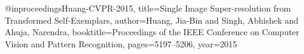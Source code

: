 @inproceedings{Huang-CVPR-2015,
  title={Single Image Super-resolution from Transformed Self-Exemplars},
  author={Huang, Jia-Bin and Singh, Abhishek and Ahuja, Narendra},
  booktitle={Proceedings of the IEEE Conference on Computer Vision and Pattern Recognition},
  pages={5197--5206},
  year={2015}
}